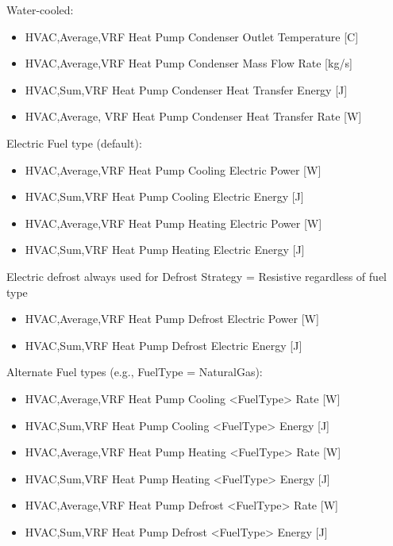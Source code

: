 Water-cooled:

\begin{itemize}
\item
  HVAC,Average,VRF Heat Pump Condenser Outlet Temperature {[}C{]}
\item
  HVAC,Average,VRF Heat Pump Condenser Mass Flow Rate {[}kg/s{]}
\item
  HVAC,Sum,VRF Heat Pump Condenser Heat Transfer Energy {[}J{]}
\item
  HVAC,Average, VRF Heat Pump Condenser Heat Transfer Rate {[}W{]}
\end{itemize}

Electric Fuel type (default):

\begin{itemize}
\item
  HVAC,Average,VRF Heat Pump Cooling Electric Power {[}W{]}
\item
  HVAC,Sum,VRF Heat Pump Cooling Electric Energy {[}J{]}
\item
  HVAC,Average,VRF Heat Pump Heating Electric Power {[}W{]}
\item
  HVAC,Sum,VRF Heat Pump Heating Electric Energy {[}J{]}
\end{itemize}

Electric defrost always used for Defrost Strategy = Resistive regardless of fuel type

\begin{itemize}
\item
  HVAC,Average,VRF Heat Pump Defrost Electric Power {[}W{]}
\item
  HVAC,Sum,VRF Heat Pump Defrost Electric Energy {[}J{]}
\end{itemize}

Alternate Fuel types (e.g., FuelType = NaturalGas):

\begin{itemize}
\item
  HVAC,Average,VRF Heat Pump Cooling \textless{}FuelType\textgreater{} Rate {[}W{]}
\item
  HVAC,Sum,VRF Heat Pump Cooling \textless{}FuelType\textgreater{} Energy {[}J{]}
\item
  HVAC,Average,VRF Heat Pump Heating \textless{}FuelType\textgreater{} Rate {[}W{]}
\item
  HVAC,Sum,VRF Heat Pump Heating \textless{}FuelType\textgreater{} Energy {[}J{]}
\item
  HVAC,Average,VRF Heat Pump Defrost \textless{}FuelType\textgreater{} Rate {[}W{]}
\item
  HVAC,Sum,VRF Heat Pump Defrost \textless{}FuelType\textgreater{} Energy {[}J{]}
\end{itemize}

